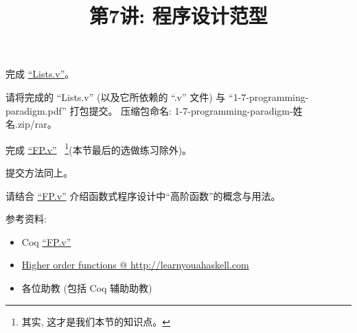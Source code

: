 \documentclass[a4paper, justified]{tufte-handout}
\title{第7讲: 程序设计范型}
\date{\zhtoday} %
\begin{document}
\maketitle
\noplagiarism %
\begin{abstract}
  \begin{center}{}
  \end{center}
\end{abstract}
\beginrequired

\begin{problem}
  完成 \href{https://github.com/hengxin/problem-solving-class-coq/blob/master/2019-1-coq/Lists.v}{``Lists.v''}。
\end{problem}

\begin{solution}
  请将完成的 ``Lists.v'' (以及它所依赖的 ``.v'' 文件) 与 ``1-7-programming-paradigm.pdf'' 打包提交。
  压缩包命名: 1-7-programming-paradigm-姓名.zip/rar。
\end{solution}

\beginoptional

\begin{problem}[Coq ``FP.v'']
  完成 \href{https://github.com/hengxin/problem-solving-class-coq/blob/master/2019-1-coq/FP.v}{``FP.v''} 
  ~\footnote{其实, 这才是我们本节的知识点。}(本节最后的选做练习除外)。
\end{problem}

\begin{solution}
  提交方法同上。
\end{solution}

\beginot

\begin{ot}
  请结合 \href{https://github.com/hengxin/problem-solving-class-coq/blob/master/2019-1-coq/FP.v}{``FP.v''} 
  介绍函数式程序设计中``高阶函数''的概念与用法。

  \noindent 参考资料:
  \begin{itemize}
    \item Coq \href{https://github.com/hengxin/problem-solving-class-coq/blob/master/2019-1-coq/FP.v}{``FP.v''}
    \item \href{http://learnyouahaskell.com/higher-order-functions}{Higher order functions @ http://learnyouahaskell.com}
    \item 各位助教 (包括 Coq 辅助助教)
  \end{itemize}
\end{ot}
\end{document}
